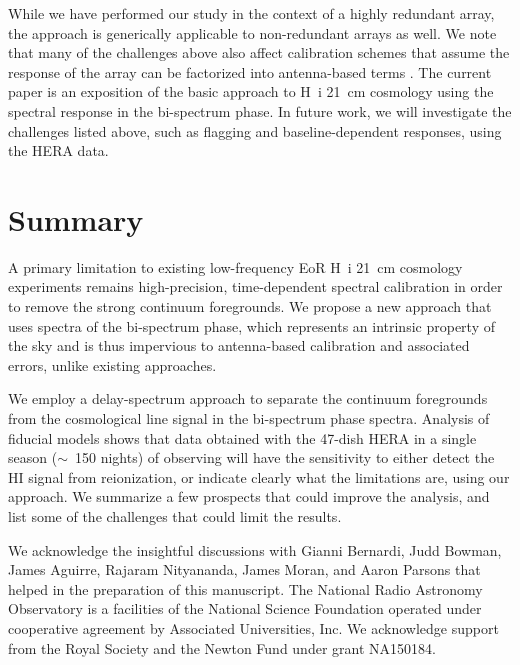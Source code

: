 \documentclass[
reprint,
superscriptaddress,
amsmath,
amssymb,
aps,
prd
]{revtex4-1}
\begin{document}
While we have performed our study in the context of a highly redundant array, the approach is generically applicable to non-redundant arrays as well. We note that many of the challenges above also affect calibration schemes that assume the response of the array can be factorized into antenna-based terms \citep{car18}. The current paper is an exposition of the basic approach to H~{\sc i} 21~cm cosmology using the spectral response in the bi-spectrum phase.  In future work, we will investigate the challenges listed above, such as flagging and baseline-dependent responses, using the HERA data.

\section{Summary}\label{sec:summary}

A primary limitation to existing low-frequency EoR H~{\sc i} 21~cm cosmology experiments remains high-precision, time-dependent spectral calibration in order to remove the strong continuum foregrounds. We propose a new approach that uses spectra of the bi-spectrum phase, which represents an intrinsic property of the sky and is thus impervious to antenna-based calibration and associated errors, unlike existing approaches.
  
We employ a delay-spectrum approach to separate the continuum foregrounds from the cosmological line signal in the bi-spectrum phase spectra. Analysis of fiducial models shows that data obtained with the 47-dish HERA in a single season ($\sim$~150 nights) of observing will have the sensitivity to either detect the HI signal from reionization, or indicate clearly what the limitations are, using our approach. We summarize a few prospects that could improve the analysis, and list some of the challenges that could limit the results. 

\begin{acknowledgments}
We acknowledge the insightful discussions with Gianni Bernardi, Judd Bowman, James Aguirre, Rajaram Nityananda, James Moran, and Aaron Parsons that helped in the preparation of this manuscript. The National Radio Astronomy Observatory is a facilities of the
National Science Foundation operated under cooperative agreement by Associated Universities, Inc. We acknowledge support from the Royal Society and the Newton Fund under grant NA150184.
\end{acknowledgments}

\end{document}
